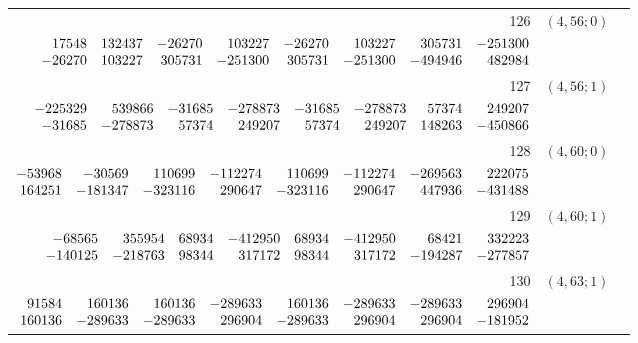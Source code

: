 \documentclass[11pt]{article}
\theoremstyle{remark}
\numberwithin{equation}{section}
\begin{document}
\begin{longtable}{rcl}
126 & $(4,56;0)$ & \begin{tabular}[t]{@{}l@{}}$w_i=\displaystyle \frac{1624697887902654849}{204995233098622956800000000000000000}$\\[3pt]{\scriptsize$\begin{array}{@{}rrrrrrrr@{}}17548 & 132437 & -26270 & 103227 & -26270 & 103227 & 305731 & -251300\\-26270 & 103227 & 305731 & -251300 & 305731 & -251300 & -494946 & 482984\end{array}$}\end{tabular}\\[8pt]
127 & $(4,56;1)$ & \begin{tabular}[t]{@{}l@{}}$w_i=\displaystyle \frac{2237150249890325499}{188279035210426657400000000000000000}$\\[3pt]{\scriptsize$\begin{array}{@{}rrrrrrrr@{}}-225329 & 539866 & -31685 & -278873 & -31685 & -278873 & 57374 & 249207\\-31685 & -278873 & 57374 & 249207 & 57374 & 249207 & 148263 & -450866\end{array}$}\end{tabular}\\[8pt]
128 & $(4,60;0)$ & \begin{tabular}[t]{@{}l@{}}$w_i=\displaystyle \frac{254018830525342133}{30027845200197838800000000000000000}$\\[3pt]{\scriptsize$\begin{array}{@{}rrrrrrrr@{}}-53968 & -30569 & 110699 & -112274 & 110699 & -112274 & -269563 & 222075\\164251 & -181347 & -323116 & 290647 & -323116 & 290647 & 447936 & -431488\end{array}$}\end{tabular}\\[8pt]
129 & $(4,60;1)$ & \begin{tabular}[t]{@{}l@{}}$w_i=\displaystyle \frac{14094485914483465883}{889012217805864640800000000000000000}$\\[3pt]{\scriptsize$\begin{array}{@{}rrrrrrrr@{}}-68565 & 355954 & 68934 & -412950 & 68934 & -412950 & 68421 & 332223\\-140125 & -218763 & 98344 & 317172 & 98344 & 317172 & -194287 & -277857\end{array}$}\end{tabular}\\[8pt]
130 & $(4,63;1)$ & \begin{tabular}[t]{@{}l@{}}$w_i=\displaystyle \frac{78185258104877}{3621970367576445000000000000000000}$\\[3pt]{\scriptsize$\begin{array}{@{}rrrrrrrr@{}}91584 & 160136 & 160136 & -289633 & 160136 & -289633 & -289633 & 296904\\160136 & -289633 & -289633 & 296904 & -289633 & 296904 & 296904 & -181952\end{array}$}\end{tabular}\\[8pt]

\end{longtable}
\end{document}

